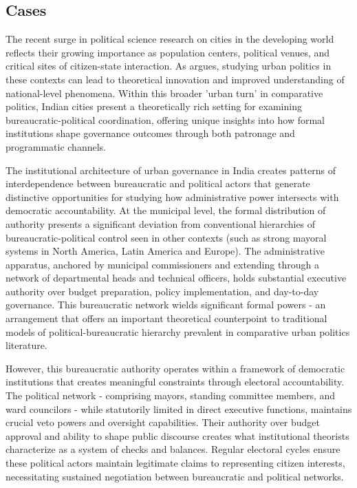 \subsection{Cases}

The recent surge in political science research on cities in the developing world reflects their growing importance as population centers, political venues, and critical sites of citizen-state interaction. As \citep{post_cities_2018} argues, studying urban politics in these contexts can lead to theoretical innovation and improved understanding of national-level phenomena. Within this broader 'urban turn' in comparative politics, Indian cities present a theoretically rich setting for examining bureaucratic-political coordination, offering unique insights into how formal institutions shape governance outcomes through both patronage and programmatic channels.

The institutional architecture of urban governance in India creates patterns of interdependence between bureaucratic and political actors that generate distinctive opportunities for studying how administrative power intersects with democratic accountability. At the municipal level, the formal distribution of authority presents a significant deviation from conventional hierarchies of bureaucratic-political control seen in other contexts (such as strong mayoral systems in North America, Latin America and Europe). The administrative apparatus, anchored by municipal commissioners and extending through a network of departmental heads and technical officers, holds substantial executive authority over budget preparation, policy implementation, and day-to-day governance. This bureaucratic network wields significant formal powers - an arrangement that offers an important theoretical counterpoint to traditional models of political-bureaucratic hierarchy prevalent in comparative urban politics literature.

However, this bureaucratic authority operates within a framework of democratic institutions that creates meaningful constraints through electoral accountability. The political network - comprising mayors, standing committee members, and ward councilors - while statutorily limited in direct executive functions, maintains crucial veto powers and oversight capabilities. Their authority over budget approval and ability to shape public discourse creates what institutional theorists characterize as a system of checks and balances. Regular electoral cycles ensure these political actors maintain legitimate claims to representing citizen interests, necessitating sustained negotiation between bureaucratic and political networks.

